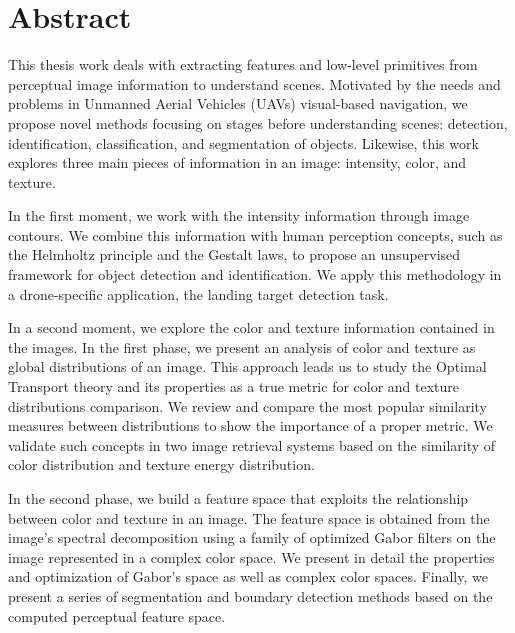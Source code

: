 \chapter*{Abstract}

\vspace*{-8ex}
\noindent This thesis work deals with extracting features and low-level primitives from perceptual image information to understand scenes. Motivated by the needs and problems in Unmanned Aerial Vehicles (UAVs) visual-based navigation, we propose novel methods focusing on stages before understanding scenes: detection, identification, classification, and segmentation of objects. Likewise, this work explores three main pieces of information in an image: intensity, color, and texture.
\newline 

\noindent In the first moment, we work with the intensity information through image contours. We combine this information with human perception concepts, such as the Helmholtz principle and the Gestalt laws, to propose an unsupervised framework for object detection and identification. We apply this methodology in a drone-specific application, the landing target detection task.
\newline

\noindent In a second moment, we explore the color and texture information contained in the images. In the first phase, we present an analysis of color and texture as global distributions of an image. This approach leads us to study the Optimal Transport theory and its properties as a true metric for color and texture distributions comparison. We review and compare the most popular similarity measures between distributions to show the importance of a proper metric. We validate such concepts in two image retrieval systems based on the similarity of color distribution and texture energy distribution. 

\noindent In the second phase, we build a feature space that exploits the relationship between color and texture in an image. The feature space is obtained from the image's spectral decomposition using a family of optimized Gabor filters on the image represented in a complex color space. We present in detail the properties and optimization of Gabor's space as well as complex color spaces. Finally, we present a series of segmentation and boundary detection methods based on the computed perceptual feature space.

